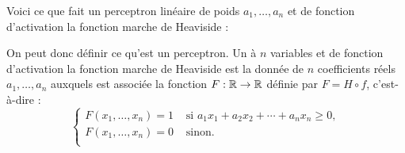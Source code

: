 Voici ce que fait un perceptron linéaire de poids $a_1,\ldots,a_n$ et de fonction d'activation la fonction marche de Heaviside :



On peut donc définir ce qu'est un perceptron. Un    à $n$ variables et de fonction d'activation la fonction marche de Heaviside est la donnée de $n$ coefficients réels $a_1,\ldots,a_n$ auxquels est associée la fonction $F : \mathbb{R} \to \mathbb{R}$ définie par $F = H \circ f$, c'est-à-dire :
$$\begin{cases}
	F(x_1,\ldots,x_n) = 1 & \text{ si } a_1 x_1 + a_2 x_2 + \cdots + a_n x_n \ge 0, \\
	F(x_1,\ldots,x_n) = 0  & \text{ sinon.} \\
\end{cases}$$



